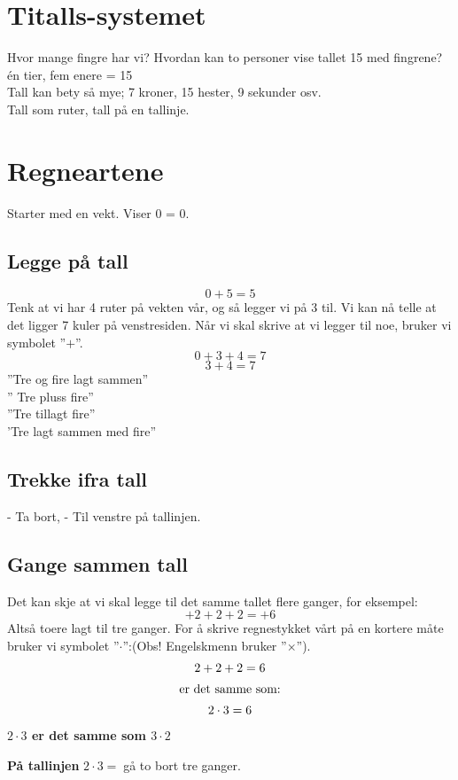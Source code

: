



\section{Titalls-systemet}
Hvor mange fingre har vi? Hvordan kan to personer vise tallet 15 med fingrene?\\

én tier, fem enere = 15\\
Tall kan bety så mye; 7 kroner, 15 hester, 9 sekunder osv.\\
Tall som ruter, tall på en tallinje.
\section{Regneartene}
Starter med en vekt. Viser 0 = 0. 
\subsection{Legge på tall}
\[ 0+5=5 \]
Tenk at vi har 4 ruter på vekten vår, og så legger vi på 3 til. Vi kan nå telle at det ligger 7 kuler på venstresiden. Når vi skal skrive at vi legger til noe, bruker vi symbolet ''$ + $''.
\[ 0+3+4=7 \]
\[ 3+4=7 \]
''Tre og fire lagt sammen''\\
'' Tre pluss fire''\\
''Tre tillagt fire''\\
'Tre lagt sammen med fire''

\subsection{Trekke ifra tall}
- Ta bort, 
- Til venstre på tallinjen.
\subsection{Gange sammen tall}
Det kan skje at vi skal legge til det samme tallet flere ganger, for eksempel:
\[ +2+2+2=+6 \]
Altså toere lagt til tre ganger. For å skrive regnestykket vårt på en kortere måte bruker vi symbolet ''$ \cdot $'':(Obs! Engelskmenn bruker ''$ \times $'').
\[ \begin{array}{c}
2+2+2=6 \br
\text{er det samme som:}\br
2\cdot3=6
\end{array} \]
 \vsk
\textbf{\boldmath $ 2\cdot3$ er det samme som $3\cdot2 $} \os

\textbf{På tallinjen}\os
$ 2\cdot3 = \;$gå to bort tre ganger.
